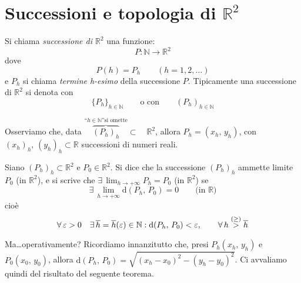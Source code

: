 \section{Successioni e topologia di $\mathbb{R}^2$}
\begin{definition}
Si chiama \emph{successione di $\mathbb{R}^2$} una funzione:
$$P:\mathbb{N} \longrightarrow \mathbb{R}^2$$
dove
$$P(h)=P_h \qquad (h=1,2,\ldots )$$
e $P_h$ si chiama \emph{termine h-esimo} della successione $P$.
Tipicamente una successione di $\mathbb{R}^2$ si denota con
$$\lbrace P_h \rbrace_{h \in \mathbb{N}} \qquad \text{o con} \qquad (P_h)_{h \in \mathbb{N}}$$
\end{definition}

Osserviamo che, data $\overbrace{(P_h)_h}^{\text{``}h \in \mathbb{N}\text{''} \text{si omette}} \subset \quad \mathbb{R}^2$, allora $P_h = (x_h,\, y_h)$, con $(x_h)_h,\, (y_h)_h \subset \mathbb{R}$ successioni di numeri reali.

\begin{definition}
Siano $(P_h)_h \subset \mathbb{R}^2$ e $P_0 \in \mathbb{R}^2$. Si dice che la successione $(P_h)_h$ ammette limite $P_0$ (in $\mathbb{R}^2$), e si scrive che $\exists \, \displaystyle \lim_{h \rightarrow +\infty} P_h = P_0$  (in $\mathbb{R}^2$) se
$$\exists \, \lim_{h \rightarrow +\infty} \mathrm{d}(P_h,\, P_0)=0 \qquad \text{(in }\mathbb{R}\text{)}$$
cioè
$$\forall \, \varepsilon > 0 \quad \exists \, \overline{h} = \overline{h}(\varepsilon) \in \mathbb{N} : \mathrm{d}(P_h,\, P_0) < \varepsilon, \qquad \forall \, h \overset{\tiny (\geq)}{>} \overline{h}$$
\end{definition}

Ma\dots operativamente? Ricordiamo innanzitutto che, presi $P_h(x_h,\, y_h)$ e $P_0(x_0,\, y_0)$, allora $\mathrm{d}(P_h,\, P_0) = \sqrt{(x_h-x_0)^2-(y_h-y_0)^2}$. Ci avvaliamo quindi del risultato del seguente teorema.

